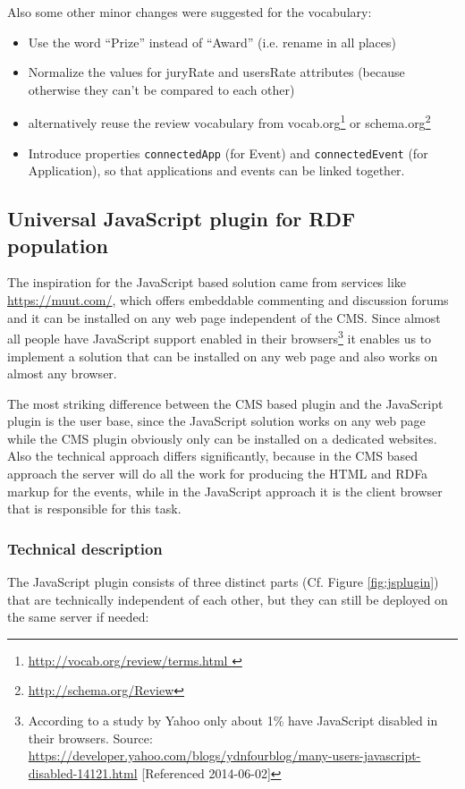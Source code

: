 Also some other minor changes were suggested for the vocabulary:
\begin{itemize}
\item Use the word ``Prize'' instead of ``Award'' (i.e. rename in all places)
\item Normalize the values for juryRate and usersRate attributes (because otherwise they can't be compared to each other)
\item alternatively reuse the review vocabulary from vocab.org\footnote{\url{http://vocab.org/review/terms.html }}  or schema.org\footnote{\url{http://schema.org/Review}} 
\item Introduce properties \texttt{connectedApp} (for Event) and \texttt{connectedEvent} (for Application), so that applications and events can be linked together.
\end{itemize}


\subsection{Universal JavaScript plugin for RDF population}
\label{sec:plugin}

The inspiration for the JavaScript based solution came from services like \url{https://muut.com/}, which offers embeddable commenting and discussion forums and it can be installed on any web page independent of the CMS. Since almost all people have JavaScript support enabled in their browsers\footnote{ According to a study by Yahoo only about 1\% have JavaScript disabled in their browsers. Source: \url{https://developer.yahoo.com/blogs/ydnfourblog/many-users-javascript-disabled-14121.html} [Referenced 2014-06-02]}  it enables us to implement a solution that can be installed on any web page and also works on almost any browser.

The most striking difference between the CMS based plugin and the JavaScript plugin is the user base, since the JavaScript solution works on any web page while the CMS plugin obviously only can be installed on a dedicated websites. Also the technical approach differs significantly, because in the CMS based approach the server will do all the work for producing the HTML and RDFa markup for the events, while in the JavaScript approach it is the client browser that is responsible for this task.


\subsubsection{Technical description}
The JavaScript plugin consists of three distinct parts (Cf. Figure \ref{fig:jsplugin}) that are technically independent of each other, but they can still be deployed on the same server if needed:

